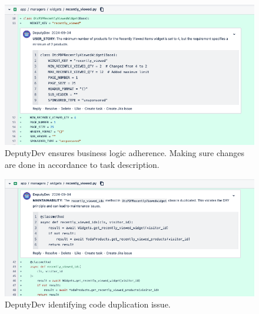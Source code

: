 \begin{appendices}
\begin{figure}[htbp]
    \centering
    \includegraphics[scale=0.40]
    {Figures/dd_comm_story.png}
    \caption{DeputyDev ensures business logic adherence. Making sure changes are done in accordance to task description.}
    \label{fig:dd_comm_story}
\end{figure}

\begin{figure}[htbp]
    \centering
    \includegraphics[scale=0.40]
    {Figures/dd_comm_maint.png}
    \caption{DeputyDev identifying code duplication issue.}
    \label{fig:dd_comm_maint}
\end{figure}


\end{appendices}

